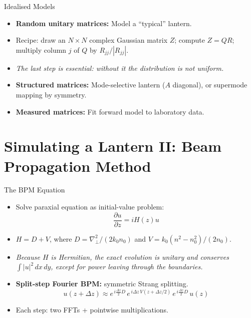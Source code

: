 \documentclass[aspectratio=169,10pt]{beamer}
\begin{document}
\begin{frame}{Idealised Models}
\begin{itemize}
    \item \textbf{Random unitary matrices:} Model a ``typical'' lantern.
    \item Recipe: draw an \(N \times N\) complex Gaussian matrix $Z$; compute $Z = QR$; multiply column $j$ of $Q$ by $R_{jj}/|R_{jj}|$.
    \item \emph{The last step is essential: without it the distribution is not uniform.}
    \item \textbf{Structured matrices:} Mode-selective lantern (\(A\) diagonal), or supermode mapping by symmetry.
    \item \textbf{Measured matrices:} Fit forward model to laboratory data.
\end{itemize}
\end{frame}

\section{Simulating a Lantern II: Beam Propagation Method}
\begin{frame}{The BPM Equation}
\begin{itemize}
    \item Solve paraxial equation as initial-value problem:
    \[
        \frac{\partial u}{\partial z} = i H(z) u
    \]
    \item \(H = D + V\), where \(D = \nabla_\perp^2 / (2k_0 n_0)\) and \(V = k_0(n^2 - n_0^2)/(2n_0)\).
    \item \emph{Because $H$ is Hermitian, the exact evolution is unitary and conserves $\int |u|^2\,dx\,dy$, except for power leaving through the boundaries.}
    \item \textbf{Split-step Fourier BPM:} symmetric Strang splitting.
    \[
        u(z+\Delta z) \approx e^{\,i \frac{\Delta z}{2} D}\, e^{\,i \Delta z\, V(z+\Delta z/2)}\, e^{\,i \frac{\Delta z}{2} D}\, u(z)
    \]
    \item Each step: two FFTs + pointwise multiplications.
\end{itemize}
\end{frame}
\end{document}
